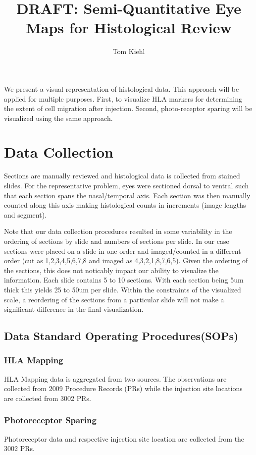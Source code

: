 \documentclass{article}
\title{DRAFT: Semi-Quantitative Eye Maps for Histological Review}
\author{Tom Kiehl}
\begin{document}

\maketitle{}



\abstract{}
We present a visual representation of histological data. This approach will be applied for multiple purposes. First, to visualize HLA markers for determining the extent of cell migration after injection. Second, photo-receptor sparing will be visualized using the same approach.


\section{Data Collection}
Sections are manually reviewed and histological data is collected from stained slides. For the representative problem, eyes were sectioned dorsal to ventral such that each section spans the nasal/temporal axis. Each section was then manually counted along this axis making histological counts in increments (image lengths and segment).

Note that our data collection procedures resulted in some variability in the ordering of sections by slide and numbers of sections per slide. In our case sections were placed on a slide in one order and imaged/counted in a different order (cut as 1,2,3,4,5,6,7,8 and imaged as 4,3,2,1,8,7,6,5). Given the ordering of the sections, this does not noticably impact our ability to visualize the information. Each slide contains 5 to 10 sections. With each section being 5um thick this yields 25 to 50um per slide. Within the constraints of the visualized scale, a reordering of the sections from a particular slide will not make a significant difference in the final visualization.

\subsection{Data Standard Operating Procedures(SOPs)}
\subsubsection{HLA Mapping}
HLA Mapping data is aggregated from two sources. The observations are collected from 2009 Procedure Records (PRs) while the injection site locations are collected from 3002 PRs.
\subsubsection{Photoreceptor Sparing}
Photoreceptor data and respective injection site location are collected from the 3002 PRs.
\end{document}
